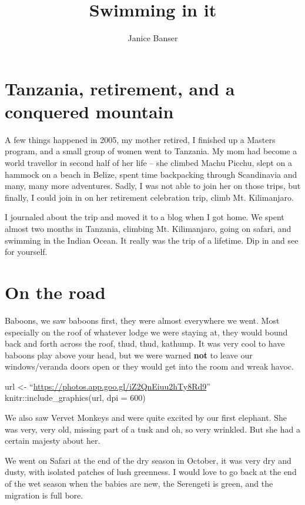 \documentclass[
  openany]{book}
\title{Swimming in it}
\author{Janice Banser}
\date{}
\begin{document}
\maketitle

{
\setcounter{tocdepth}{1}
\tableofcontents
}
\hypertarget{tanzania-retirement-and-a-conquered-mountain}{%
\chapter{Tanzania, retirement, and a conquered mountain}\label{tanzania-retirement-and-a-conquered-mountain}}

A few things happened in 2005, my mother retired, I finished up a Masters program, and a small group of women went to Tanzania. My mom had become a world travellor in second half of her life -- she climbed Machu Picchu, slept on a hammock on a beach in Belize, spent time backpacking through Scandinavia and many, many more adventures. Sadly, I was not able to join her on those trips, but finally, I could join in on her retirement celebration trip, climb Mt. Kilimanjaro.

I journaled about the trip and moved it to a blog when I got home. We spent almost two months in Tanzania, climbing Mt. Kilimanjaro, going on safari, and swimming in the Indian Ocean. It really was the trip of a lifetime. Dip in and see for yourself.

\hypertarget{on-the-road}{%
\chapter{On the road}\label{on-the-road}}

Baboons, we saw baboons first, they were almost everywhere we went. Most especially on the roof of whatever lodge we were staying at, they would bound back and forth across the roof, thud, thud, kathump. It was very cool to have baboons play above your head, but we were warned \textbf{not} to leave our windows/veranda doors open or they would get into the room and wreak havoc.

url \textless- ``\url{https://photos.app.goo.gl/iZ2QnEiuu2hTy8Rd9}''
knitr::include\_graphics(url, dpi = 600)

We also saw Vervet Monkeys and were quite excited by our first elephant. She was very, very old, missing part of a tusk and oh, so very wrinkled. But she had a certain majesty about her.

We went on Safari at the end of the dry season in October, it was very dry and dusty, with isolated patches of lush greenness. I would love to go back at the end of the wet season when the babies are new, the Serengeti is green, and the migration is full bore.
\end{document}
